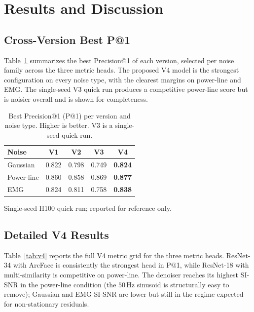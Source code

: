 \documentclass{IEEEtran}
\begin{document}
\section{Results and Discussion}
\subsection{Cross-Version Best P@1}
Table~\ref{tab:cross} summarizes the best Precision@1 of each version,
selected per noise family across the three metric heads. The proposed V4
model is the strongest configuration on every noise type, with the
clearest margins on power-line and EMG. The single-seed V3 quick run
produces a competitive power-line score but is noisier overall and is
shown for completeness.

\begin{table}[t]
\centering
\caption{Best Precision@1 (P@1) per version and noise type. Higher is
better. V3 is a single-seed quick run.}
\label{tab:cross}
\begin{threeparttable}
\begin{tabular}{l c c c c}
\toprule
\textbf{Noise} & \textbf{V1} & \textbf{V2} & \textbf{V3}\tnote{$\dagger$}
& \textbf{V4} \\
\midrule
Gaussian   & 0.822 & 0.798 & 0.749 & \textbf{0.824} \\
Power-line & 0.860 & 0.858 & 0.869 & \textbf{0.877} \\
EMG        & 0.824 & 0.811 & 0.758 & \textbf{0.838} \\
\bottomrule
\end{tabular}
\begin{tablenotes}\footnotesize
\item[$\dagger$] Single-seed H100 quick run; reported for reference only.
\end{tablenotes}
\end{threeparttable}
\end{table}

\subsection{Detailed V4 Results}
Table~\ref{tab:v4} reports the full V4 metric grid for the three metric
heads. ResNet-34 with ArcFace is consistently the strongest head in P@1,
while ResNet-18 with multi-similarity is competitive on power-line. The
denoiser reaches its highest SI-SNR in the power-line condition (the
$50$\,Hz sinusoid is structurally easy to remove); Gaussian and EMG
SI-SNR are lower but still in the regime expected for non-stationary
residuals.
\end{document}
